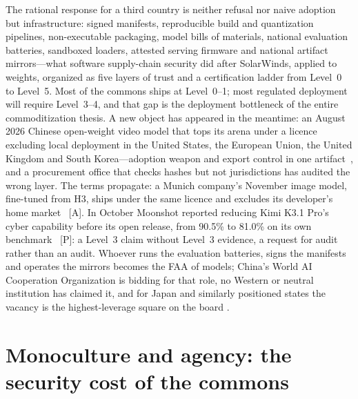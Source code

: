 The rational response for a third country is neither refusal nor naive adoption but infrastructure: signed manifests, reproducible build and quantization pipelines, non-executable packaging, model bills of materials, national evaluation batteries, sandboxed loaders, attested serving firmware and national artifact mirrors---what software supply-chain security did after SolarWinds, applied to weights, organized as five layers of trust and a certification ladder from Level~0 to Level~5. Most of the commons ships at Level~0--1; most regulated deployment will require Level~3--4, and that gap is the deployment bottleneck of the entire commoditization thesis. A new object has appeared in the meantime: an August 2026 Chinese open-weight video model that tops its arena under a licence excluding local deployment in the United States, the European Union, the United Kingdom and South Korea---adoption weapon and export control in one artifact~\cite{minimax-geofence}, and a procurement office that checks hashes but not jurisdictions has audited the wrong layer. The terms propagate: a Munich company's November image model, fine-tuned from H3, ships under the same licence and excludes its developer's home market~\cite{lit-pruna} [A]. In October Moonshot reported reducing Kimi K3.1 Pro's cyber capability before its open release, from 90.5\% to 81.0\% on its own benchmark~\cite{mdl-kimi-k31} [P]: a Level~3 claim without Level~3 evidence, a request for audit rather than an audit. Whoever runs the evaluation batteries, signs the manifests and operates the mirrors becomes the FAA of models; China's World AI Cooperation Organization is bidding for that role, no Western or neutral institution has claimed it, and for Japan and similarly positioned states the vacancy is the highest-leverage square on the board .

\section{Monoculture and agency: the security cost of the commons}

